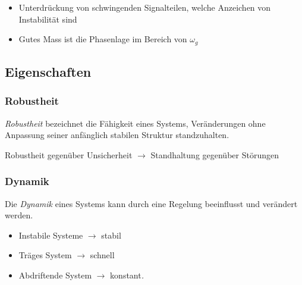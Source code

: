 \documentclass[
  10pt,
  a4paper,
]{article}
\providecommand{\tightlist}{%
  \setlength{\itemsep}{0pt}\setlength{\parskip}{0pt}}\usepackage{longtable,booktabs,array}
\numberwithin{equation}{section}
\begin{document}
\begin{multicols}{2}
\begin{figure}[H]
{}

\end{figure}

\begin{itemize}
\tightlist
\item
  Unterdrückung von schwingenden Signalteilen, welche Anzeichen von
  Instabilität sind
\item
  Gutes Mass ist die Phasenlage im Bereich von \(\omega_g\)
\end{itemize}

\hypertarget{eigenschaften}{%
\subsection{Eigenschaften}\label{eigenschaften}}

\hypertarget{robustheit}{%
\subsubsection{Robustheit}\label{robustheit}}

\emph{Robustheit} bezeichnet die Fähigkeit eines Systems, Veränderungen
ohne Anpassung seiner anfänglich stabilen Struktur standzuhalten.

Robustheit gegenüber Unsicherheit \(\rightarrow\) Standhaltung gegenüber
Störungen

\hypertarget{dynamik}{%
\subsubsection{Dynamik}\label{dynamik}}

Die \emph{Dynamik} eines Systems kann durch eine Regelung beeinflusst
und verändert werden.

\begin{itemize}
\tightlist
\item
  Instabile Systeme \(\rightarrow\) stabil
\item
  Träges System \(\rightarrow\) schnell
\item
  Abdriftende System \(\rightarrow\) konstant\emph{.}
\end{itemize}

\begin{tcolorbox}[enhanced jigsaw, coltitle=black, arc=.35mm, breakable, opacityback=0, opacitybacktitle=0.6, rightrule=.15mm, titlerule=0mm, bottomrule=.15mm, leftrule=.75mm, bottomtitle=1mm, colframe=quarto-callout-caution-color-frame, toprule=.15mm, colbacktitle=quarto-callout-caution-color!10!white, toptitle=1mm, title=\textcolor{quarto-callout-caution-color}{\faFire}\hspace{0.5em}{Abhängigkeit}, left=2mm, colback=white]


\end{tcolorbox}
\end{multicols}
\end{document}
